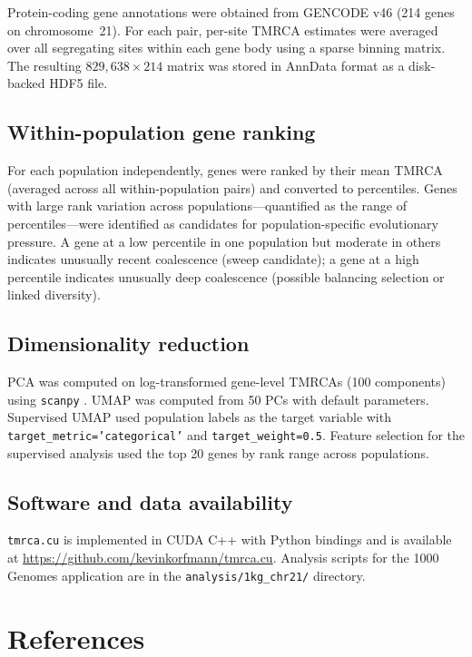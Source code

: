 \documentclass[10pt,letterpaper]{article}
\begin{document}
Protein-coding gene annotations were obtained from GENCODE v46 \cite{Frankish2019} (214 genes on chromosome~21).
For each pair, per-site TMRCA estimates were averaged over all segregating sites within each gene body using a sparse binning matrix.
The resulting $829{,}638 \times 214$ matrix was stored in AnnData format \cite{Wolf2018} as a disk-backed HDF5 file.

\subsection*{Within-population gene ranking}

For each population independently, genes were ranked by their mean TMRCA (averaged across all within-population pairs) and converted to percentiles.
Genes with large rank variation across populations---quantified as the range of percentiles---were identified as candidates for population-specific evolutionary pressure.
A gene at a low percentile in one population but moderate in others indicates unusually recent coalescence (sweep candidate); a gene at a high percentile indicates unusually deep coalescence (possible balancing selection or linked diversity).

\subsection*{Dimensionality reduction}

PCA was computed on log-transformed gene-level TMRCAs (100 components) using \texttt{scanpy} \cite{Wolf2018}.
UMAP \cite{McInnes2018} was computed from 50 PCs with default parameters.
Supervised UMAP used population labels as the target variable with \texttt{target\_metric='categorical'} and \texttt{target\_weight=0.5}.
Feature selection for the supervised analysis used the top 20 genes by rank range across populations.

\subsection*{Software and data availability}

\texttt{tmrca.cu} is implemented in CUDA C++ with Python bindings and is available at \url{https://github.com/kevinkorfmann/tmrca.cu}.
Analysis scripts for the 1000 Genomes application are in the \texttt{analysis/1kg\_chr21/} directory.

\section*{References}
\end{document}
